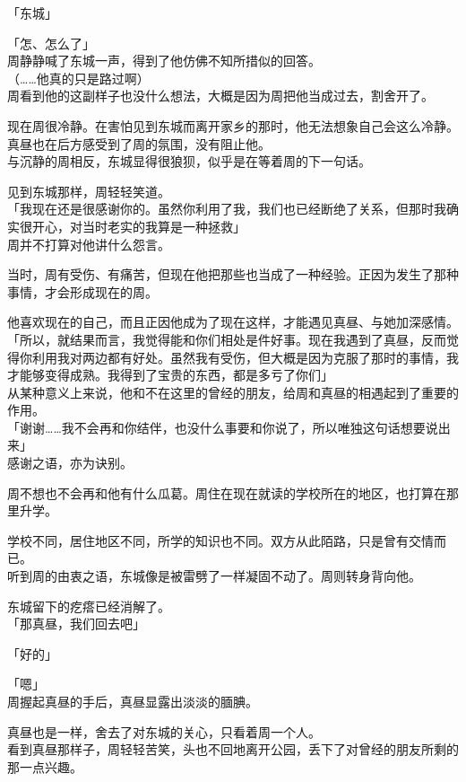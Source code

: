 「东城」

「怎、怎么了」\\

周静静喊了东城一声，得到了他仿佛不知所措似的回答。\\

（……他真的只是路过啊）\\

周看到他的这副样子也没什么想法，大概是因为周把他当成过去，割舍开了。

现在周很冷静。在害怕见到东城而离开家乡的那时，他无法想象自己会这么冷静。真昼也在后方感受到了周的氛围，没有阻止他。\\

与沉静的周相反，东城显得很狼狈，似乎是在等着周的下一句话。

见到东城那样，周轻轻笑道。\\

「我现在还是很感谢你的。虽然你利用了我，我们也已经断绝了关系，但那时我确实很开心，对当时老实的我算是一种拯救」\\

周并不打算对他讲什么怨言。

当时，周有受伤、有痛苦，但现在他把那些也当成了一种经验。正因为发生了那种事情，才会形成现在的周。

他喜欢现在的自己，而且正因他成为了现在这样，才能遇见真昼、与她加深感情。\\

「所以，就结果而言，我觉得能和你们相处是件好事。现在我遇到了真昼，反而觉得你利用我对两边都有好处。虽然我有受伤，但大概是因为克服了那时的事情，我才能够变得成熟。我得到了宝贵的东西，都是多亏了你们」\\

从某种意义上来说，他和不在这里的曾经的朋友，给周和真昼的相遇起到了重要的作用。\\

「谢谢……我不会再和你结伴，也没什么事要和你说了，所以唯独这句话想要说出来」\\

感谢之语，亦为诀别。

周不想也不会再和他有什么瓜葛。周住在现在就读的学校所在的地区，也打算在那里升学。

学校不同，居住地区不同，所学的知识也不同。双方从此陌路，只是曾有交情而已。\\

听到周的由衷之语，东城像是被雷劈了一样凝固不动了。周则转身背向他。

东城留下的疙瘩已经消解了。\\

「那真昼，我们回去吧」

「好的」

「嗯」\\

周握起真昼的手后，真昼显露出淡淡的腼腆。

真昼也是一样，舍去了对东城的关心，只看着周一个人。\\

看到真昼那样子，周轻轻苦笑，头也不回地离开公园，丢下了对曾经的朋友所剩的那一点兴趣。
